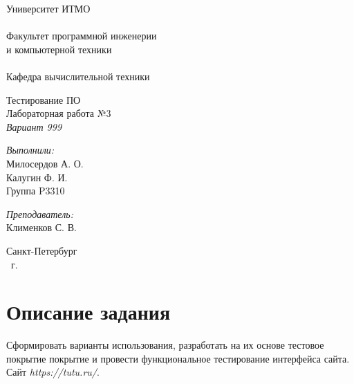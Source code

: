﻿\documentclass[article]{article}
\begin{document}
\begin{titlepage}
\begin{center}

\LARGE{\sc Университет ИТМО}\\~\\
\Large{\sc Факультет программной инженерии \\ и компьютерной техники}\\~\\
\Large{\sc Кафедра вычислительной техники}\\
\vfill

\Large{\sc Тестирование ПО\\ Лабораторная работа №3 \\ \emph{Вариант 999} }

\vfill
 
\textwidth
\begin{minipage}{0.3\textwidth}
\begin{flushleft}

\large \emph{Выполнили:} \\  Милосердов А. О. \\ Калугин Ф. И.\\ Группа P3310

\vskip0.4in

\large \emph{Преподаватель:} \\ Клименков С. В.
\end{flushleft}

\end{minipage}
\vfill
\large Санкт-Петербург \\ \the\year  \ г.
\thispagestyle{empty}
 
\end{center}
\end{titlepage}
\captionsetup{justification=raggedright,singlelinecheck=false}
\newpage
\section*{Описание задания}
Сформировать варианты использования, разработать на их основе тестовое покрытие покрытие и провести функциональное тестирование интерфейса сайта. Сайт \emph{https://tutu.ru/}.
\end{document}
